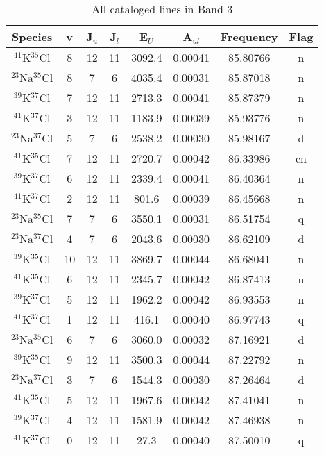 \begin{table*}[htp]
\centering
\caption{All cataloged lines in Band 3}
\begin{tabular}{cccccccc}
\label{tab:all_detections_B3}
Species & v & J$_u$ & J$_l$ & E$_U$ & A$_{ul}$ & Frequency & Flag \\
\hline
$^{41}$K$^{35}$Cl & 8 & 12 & 11 & 3092.4 & 0.00041 & 85.80766 & n \\
$^{23}$Na$^{35}$Cl & 8 & 7 & 6 & 4035.4 & 0.00031 & 85.87018 & n \\
$^{39}$K$^{37}$Cl & 7 & 12 & 11 & 2713.3 & 0.00041 & 85.87379 & n \\
$^{41}$K$^{37}$Cl & 3 & 12 & 11 & 1183.9 & 0.00039 & 85.93776 & n \\
$^{23}$Na$^{37}$Cl & 5 & 7 & 6 & 2538.2 & 0.00030 & 85.98167 & d \\
$^{41}$K$^{35}$Cl & 7 & 12 & 11 & 2720.7 & 0.00042 & 86.33986 & cn \\
$^{39}$K$^{37}$Cl & 6 & 12 & 11 & 2339.4 & 0.00041 & 86.40364 & n \\
$^{41}$K$^{37}$Cl & 2 & 12 & 11 & 801.6 & 0.00039 & 86.45668 & n \\
$^{23}$Na$^{35}$Cl & 7 & 7 & 6 & 3550.1 & 0.00031 & 86.51754 & q \\
$^{23}$Na$^{37}$Cl & 4 & 7 & 6 & 2043.6 & 0.00030 & 86.62109 & d \\
$^{39}$K$^{35}$Cl & 10 & 12 & 11 & 3869.7 & 0.00044 & 86.68041 & n \\
$^{41}$K$^{35}$Cl & 6 & 12 & 11 & 2345.7 & 0.00042 & 86.87413 & n \\
$^{39}$K$^{37}$Cl & 5 & 12 & 11 & 1962.2 & 0.00042 & 86.93553 & n \\
$^{41}$K$^{37}$Cl & 1 & 12 & 11 & 416.1 & 0.00040 & 86.97743 & q \\
$^{23}$Na$^{35}$Cl & 6 & 7 & 6 & 3060.0 & 0.00032 & 87.16921 & d \\
$^{39}$K$^{35}$Cl & 9 & 12 & 11 & 3500.3 & 0.00044 & 87.22792 & n \\
$^{23}$Na$^{37}$Cl & 3 & 7 & 6 & 1544.3 & 0.00030 & 87.26464 & d \\
$^{41}$K$^{35}$Cl & 5 & 12 & 11 & 1967.6 & 0.00042 & 87.41041 & n \\
$^{39}$K$^{37}$Cl & 4 & 12 & 11 & 1581.9 & 0.00042 & 87.46938 & n \\
$^{41}$K$^{37}$Cl & 0 & 12 & 11 & 27.3 & 0.00040 & 87.50010 & q \\

\end{tabular}
\end{table*}
